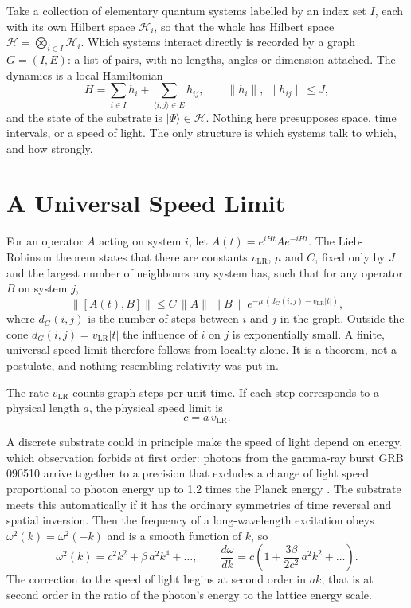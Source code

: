 \documentclass[aps,prd,onecolumn,nofootinbib,superscriptaddress]{revtex4-2}
\begin{document}
Take a collection of elementary quantum systems labelled by an index set $I$, each with its own Hilbert space $\mathcal{H}_i$, so that the whole has Hilbert space $\mathcal{H} = \bigotimes_{i\in I}\mathcal{H}_i$. Which systems interact directly is recorded by a graph $G = (I, E)$: a list of pairs, with no lengths, angles or dimension attached. The dynamics is a local Hamiltonian
\begin{equation}
H = \sum_{i\in I} h_i + \sum_{\langle i,j\rangle \in E} h_{ij}, \qquad \|h_i\|,\ \|h_{ij}\| \le J,
\end{equation}
and the state of the substrate is $|\Psi\rangle \in \mathcal{H}$. Nothing here presupposes space, time intervals, or a speed of light. The only structure is which systems talk to which, and how strongly.

\section{A Universal Speed Limit}
\label{sec:causal}

For an operator $A$ acting on system $i$, let $A(t) = e^{iHt} A e^{-iHt}$. The Lieb-Robinson theorem \cite{liebrobinson1972} states that there are constants $v_{\mathrm{LR}}$, $\mu$ and $C$, fixed only by $J$ and the largest number of neighbours any system has, such that for any operator $B$ on system $j$,
\begin{equation}
\big\|[A(t), B]\big\| \le C\,\|A\|\,\|B\|\; e^{-\mu\,(d_G(i,j) - v_{\mathrm{LR}}|t|)},
\label{eq:lr}
\end{equation}
where $d_G(i,j)$ is the number of steps between $i$ and $j$ in the graph. Outside the cone $d_G(i,j) = v_{\mathrm{LR}}|t|$ the influence of $i$ on $j$ is exponentially small. A finite, universal speed limit therefore follows from locality alone. It is a theorem, not a postulate, and nothing resembling relativity was put in.

The rate $v_{\mathrm{LR}}$ counts graph steps per unit time. If each step corresponds to a physical length $a$, the physical speed limit is
\begin{equation}
c = a\,v_{\mathrm{LR}}.
\label{eq:c}
\end{equation}

A discrete substrate could in principle make the speed of light depend on energy, which observation forbids at first order: photons from the gamma-ray burst GRB 090510 arrive together to a precision that excludes a change of light speed proportional to photon energy up to 1.2 times the Planck energy \cite{abdo2009}. The substrate meets this automatically if it has the ordinary symmetries of time reversal and spatial inversion. Then the frequency of a long-wavelength excitation obeys $\omega^2(k) = \omega^2(-k)$ and is a smooth function of $k$, so
\begin{equation}
\omega^2(k) = c^2 k^2 + \beta\,a^2 k^4 + \dots, \qquad \frac{d\omega}{dk} = c\left(1 + \frac{3\beta}{2c^2}\,a^2k^2 + \dots\right).
\end{equation}
The correction to the speed of light begins at second order in $ak$, that is at second order in the ratio of the photon's energy to the lattice energy scale.
\end{document}
